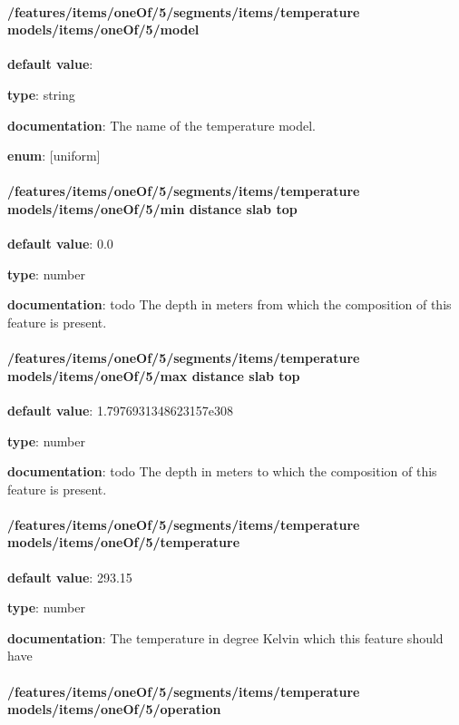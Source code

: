 \paragraph{/features/items/oneOf/5/segments/items/temperature models/items/oneOf/5/model} \begin{itemized}
\item {\bf default value}: 
\item {\bf type}: string
\item {\bf documentation}: The name of the temperature model.
\item {\bf enum}: [uniform]\end{itemized}\paragraph{/features/items/oneOf/5/segments/items/temperature models/items/oneOf/5/min distance slab top} \begin{itemized}
\item {\bf default value}: 0.0
\item {\bf type}: number
\item {\bf documentation}: todo The depth in meters from which the composition of this feature is present.
\end{itemized}\paragraph{/features/items/oneOf/5/segments/items/temperature models/items/oneOf/5/max distance slab top} \begin{itemized}
\item {\bf default value}: 1.7976931348623157e308
\item {\bf type}: number
\item {\bf documentation}: todo The depth in meters to which the composition of this feature is present.
\end{itemized}\paragraph{/features/items/oneOf/5/segments/items/temperature models/items/oneOf/5/temperature} \begin{itemized}
\item {\bf default value}: 293.15
\item {\bf type}: number
\item {\bf documentation}: The temperature in degree Kelvin which this feature should have
\end{itemized}\paragraph{/features/items/oneOf/5/segments/items/temperature models/items/oneOf/5/operation} \begin{itemized}

\end{itemized}

